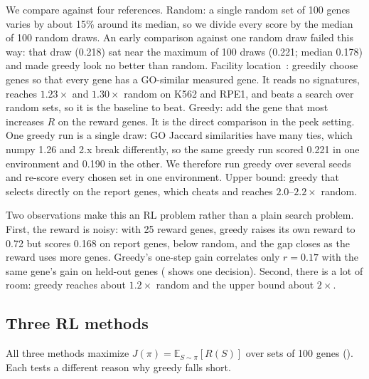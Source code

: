 \documentclass[11pt, letterpaper]{cmu}
\let\Cref\crtCref
\begin{document}
We compare against four references. Random: a single random set of 100 genes varies by about
15\% around its median, so we divide every score by the median of 100 random draws. An early
comparison against one random draw failed this way: that draw (0.218) sat near the maximum of
100 draws (0.221; median 0.178) and made greedy look no better than random. Facility
location~\citep{nemhauser1978submodular}: greedily choose genes so that every gene has a
GO-similar measured gene. It reads no signatures, reaches $1.23\times$ and $1.30\times$ random on
K562 and RPE1, and beats a search over random sets, so it is the baseline to beat. Greedy: add
the gene that most increases $R$ on the reward genes. It is the direct comparison in the peek
setting. One greedy run is a single draw: GO Jaccard similarities have many ties, which numpy
1.26 and 2.x break differently, so the same greedy run scored 0.221 in one environment and 0.190
in the other. We therefore run greedy over several seeds and re-score every chosen set in one
environment. Upper bound:
greedy that selects directly on the report genes, which cheats and reaches $2.0$--$2.2\times$
random.

Two observations make this an RL problem rather than a plain search problem. First, the reward
is noisy: with 25 reward genes, greedy raises its own reward to 0.72 but scores 0.168 on report
genes, below random, and the gap closes as the reward uses more genes. Greedy's one-step gain
correlates only $r{=}0.17$ with the same gene's gain on held-out genes (\Cref{fig:noise} shows
one decision). Second, there is a lot of room: greedy reaches about $1.2\times$ random and the
upper bound about $2\times$.

\subsection{Three RL methods}
\label{sec:methods}

All three methods maximize $J(\pi)=\mathbb{E}_{S\sim\pi}[R(S)]$ over sets of 100 genes
(\Cref{alg:episode}). Each tests a different reason why greedy falls short.
\end{document}
